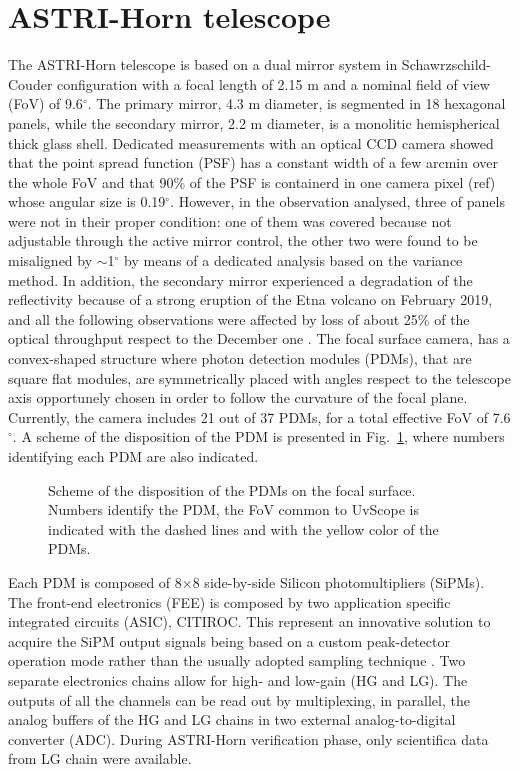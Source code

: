 \section{ASTRI-Horn telescope} 
The ASTRI-Horn telescope is based on a dual mirror system in Schawrzschild-Couder configuration
with a focal length of 2.15 m and a nominal field of view (FoV) of 9.6$^\circ$. 
The primary mirror, 4.3 m diameter, is segmented in 18 hexagonal panels, 
while the secondary mirror, 2.2 m diameter, is a monolitic hemispherical thick glass shell. 
Dedicated measurements  with an optical CCD camera showed that the
point spread function (PSF) has a constant width of a few arcmin
over the whole FoV and that  90\% of the PSF  is containerd in one camera pixel (ref)
whose angular size is 0.19$^\circ$. 
However, in the observation analysed, three of panels were not in their proper condition:
one of them was covered because not adjustable through the active mirror control, the other two were found to be misaligned by $\sim$1$^\circ$ by means of a dedicated analysis based on the variance method.
In addition, the secondary mirror experienced a degradation of the reflectivity because of a strong eruption of the Etna volcano on February 2019, and all the following observations were affected by loss of about 25\% of the optical throughput
respect to the December one \cite{Mineo2019}. 
The focal surface camera, has a convex-shaped structure where photon detection modules (PDMs), that are square flat modules, are symmetrically placed with angles respect to the telescope axis opportunely chosen in order to follow the curvature of the focal plane.
Currently, the camera includes 21 out of 37 PDMs, for a total effective FoV of 7.6$^\circ$.
A scheme of the disposition of the PDM is presented in Fig.~\ref{fig:camera}, where numbers identifying each PDM are also indicated. 
\begin{figure}
\caption{Scheme of the disposition of the PDMs on the focal surface. Numbers identify the PDM, the FoV common to UvScope is indicated with the dashed lines and with the yellow color of the PDMs.}
\label{fig:camera}
\end{figure}

Each PDM is composed of 8$\times$8 side-by-side Silicon photomultipliers (SiPMs). The front-end electronics (FEE) is composed by two application specific integrated circuits (ASIC), CITIROC. This represent an innovative solution to acquire the SiPM output signals  being based on a custom peak-detector operation mode rather than the usually adopted sampling technique \cite{Sottile2016}. Two separate electronics chains allow for high- and low-gain (HG and LG). The outputs of all the channels can be read out by multiplexing, in parallel, the analog buffers of the HG and LG chains in two external analog-to-digital converter (ADC). During ASTRI-Horn verification phase, only scientifica data from LG chain were available.


